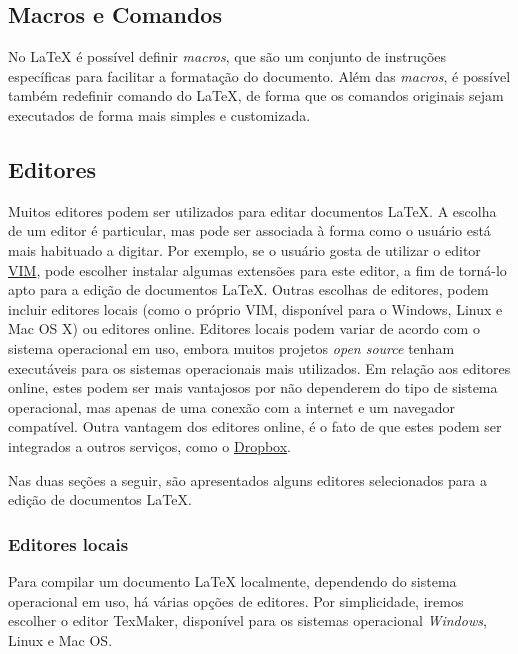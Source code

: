 \subsection{Macros e Comandos}
\label{sec:mac_cmd}

No LaTeX é possível definir \textit{macros}, que são um conjunto de instruções específicas para facilitar a formatação do documento. Além das \textit{macros}, é possível também redefinir comando do LaTeX, de forma que os comandos originais sejam executados de forma mais simples e customizada.


\subsection{Editores}
\label{sec:editores}

Muitos editores podem ser utilizados para editar documentos LaTeX. A escolha de um editor é particular, mas pode ser associada à forma como o usuário está mais habituado a digitar. Por exemplo, se o usuário gosta de utilizar o editor \href{https://www.vim.org}{VIM}, pode escolher instalar algumas extensões para este editor, a fim de torná-lo apto para a edição de documentos LaTeX. Outras escolhas de editores, podem incluir editores locais (como o próprio VIM, disponível para o Windows, Linux e Mac OS X) ou editores online. Editores locais podem variar de acordo com o sistema operacional em uso, embora muitos projetos \textit{open source} tenham executáveis para os sistemas operacionais mais utilizados. Em relação aos editores online, estes podem ser mais vantajosos por não dependerem do tipo de sistema operacional, mas apenas de uma conexão com a internet e um navegador compatível. Outra vantagem dos editores online, é o fato de que estes podem ser integrados a outros serviços, como o \href{https://dropbox.com}{Dropbox}.

Nas duas seções a seguir, são apresentados alguns editores selecionados para a edição de documentos LaTeX.

\subsubsection*{Editores locais}
\label{sec:ed_local}

Para compilar um documento LaTeX localmente, dependendo do sistema operacional em uso, há várias opções de editores. Por simplicidade, iremos escolher o editor TexMaker, disponível para os sistemas operacional \textit{Windows}, Linux e Mac OS.


